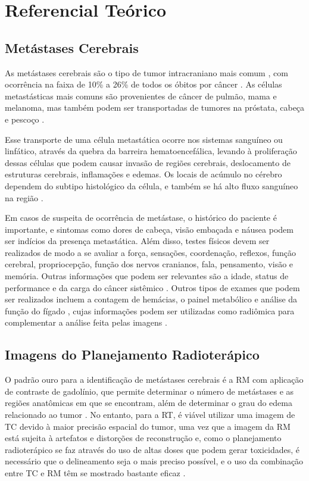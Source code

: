     \chapter{Referencial Teórico}\label{chap:teorico}

\section{Metástases Cerebrais}

As metástases cerebrais são o tipo de tumor intracraniano mais comum \cite{Achrol:2019,Amsbaugh:2023,Cho:2020,Lin:2015}, com ocorrência na faixa de 10\% a 26\% de todos os óbitos por câncer \cite{Amsbaugh:2023}. As células metastásticas mais comuns são provenientes de câncer de pulmão, mama e melanoma, mas também podem ser transportadas de tumores na próstata, cabeça e pescoço \cite{Amsbaugh:2023}.

Esse transporte de uma célula metastática ocorre nos sistemas sanguíneo ou linfático, através da quebra da barreira hematoencefálica, levando à proliferação dessas células que podem causar invasão de regiões cerebrais, deslocamento de estruturas cerebrais, inflamações e edemas. Os locais de acúmulo no cérebro dependem do subtipo histológico da célula, e também se há alto fluxo sanguíneo na região \cite{Amsbaugh:2023}.

Em casos de suspeita de ocorrência de metástase, o histórico do paciente é importante, e sintomas como dores de cabeça, visão embaçada e náusea podem ser indícios da presença metastática. Além disso, testes físicos devem ser realizados de modo a se avaliar a força, sensações, coordenação, reflexos, função cerebral, propriocepção, função dos nervos cranianos, fala, pensamento, visão e memória. Outras informações que podem ser relevantes são a idade, status de performance e da carga do câncer sistêmico \cite{Amsbaugh:2023}. Outros tipos de exames que podem ser realizados incluem a contagem de hemácias, o painel metabólico e análise da função do fígado \cite{Amsbaugh:2023}, cujas informações podem ser utilizadas como radiômica para complementar a análise feita pelas imagens \cite{Bibault:2021}.


\section{Imagens do Planejamento Radioterápico}

O padrão ouro para a identificação de metástases cerebrais é a RM com aplicação de contraste de gadolínio, que permite determinar o número de metástases e as regiões anatômicas em que se encontram, além de determinar o grau do edema relacionado ao tumor \cite{Amsbaugh:2023}. No entanto, para a RT, é viável utilizar uma imagem de TC devido à maior precisão espacial do tumor, uma vez que a imagem da RM está sujeita à artefatos e distorções de reconstrução \cite{Hu:2019} e, como o planejamento radioterápico se faz através do uso de altas doses que podem gerar toxicidades, é necessário que o delineamento seja o mais preciso possível, e o uso da combinação entre TC e RM têm se mostrado bastante eficaz \cite{Demiral:2019}. 

